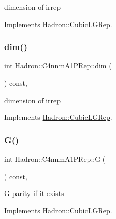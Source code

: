 dimension of irrep 

Implements \mbox{\hyperlink{structHadron_1_1CubicLGRep_a3acbaea26503ed64f20df693a48e4cdd}{Hadron\+::\+Cubic\+L\+G\+Rep}}.

\mbox{\label{structHadron_1_1C4nnmA1PRep_ad5f1c0aaa30200d50b2d1e6b9d05a0b5}} 
\subsubsection{\texorpdfstring{dim()}{dim()}\hspace{0.1cm}{\footnotesize\ttfamily [3/3]}}
{\footnotesize\ttfamily int Hadron\+::\+C4nnm\+A1\+P\+Rep\+::dim (\begin{DoxyParamCaption}{ }\end{DoxyParamCaption}) const\hspace{0.3cm}{\ttfamily [inline]}, {\ttfamily [virtual]}}

dimension of irrep 

Implements \mbox{\hyperlink{structHadron_1_1CubicLGRep_a3acbaea26503ed64f20df693a48e4cdd}{Hadron\+::\+Cubic\+L\+G\+Rep}}.

\mbox{\label{structHadron_1_1C4nnmA1PRep_aa2cf1b68b97f5403efa313215bb61fbd}} 
\subsubsection{\texorpdfstring{G()}{G()}\hspace{0.1cm}{\footnotesize\ttfamily [1/3]}}
{\footnotesize\ttfamily int Hadron\+::\+C4nnm\+A1\+P\+Rep\+::G (\begin{DoxyParamCaption}{ }\end{DoxyParamCaption}) const\hspace{0.3cm}{\ttfamily [inline]}, {\ttfamily [virtual]}}

G-\/parity if it exists 

Implements \mbox{\hyperlink{structHadron_1_1CubicLGRep_ace26f7b2d55e3a668a14cb9026da5231}{Hadron\+::\+Cubic\+L\+G\+Rep}}.

\mbox{\label{structHadron_1_1C4nnmA1PRep_aa2cf1b68b97f5403efa313215bb61fbd}} 
